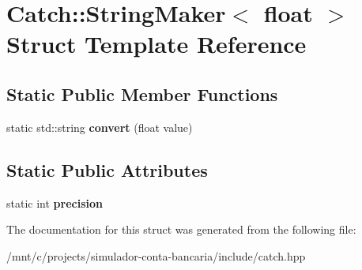 \hypertarget{structCatch_1_1StringMaker_3_01float_01_4}{}\section{Catch\+:\+:String\+Maker$<$ float $>$ Struct Template Reference}
\label{structCatch_1_1StringMaker_3_01float_01_4}
\subsection*{Static Public Member Functions}
\begin{DoxyCompactItemize}
\item 
\mbox{\label{structCatch_1_1StringMaker_3_01float_01_4_a7ffacc6fa46a338200f3fbb2ee078648}} 
static std\+::string {\bfseries convert} (float value)
\end{DoxyCompactItemize}
\subsection*{Static Public Attributes}
\begin{DoxyCompactItemize}
\item 
\mbox{\label{structCatch_1_1StringMaker_3_01float_01_4_a54ebebe76a755dbe2dd8ad409c329378}} 
static int {\bfseries precision}
\end{DoxyCompactItemize}


The documentation for this struct was generated from the following file\+:\begin{DoxyCompactItemize}
\item 
/mnt/c/projects/simulador-\/conta-\/bancaria/include/catch.\+hpp\end{DoxyCompactItemize}
